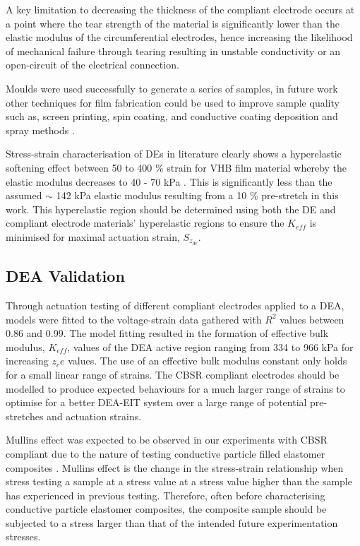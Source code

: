 A key limitation to decreasing the thickness of the compliant electrode occurs at a point where the tear strength of the material is significantly lower than the elastic modulus of the circumferential electrodes, hence increasing the likelihood of mechanical failure through tearing resulting in unstable conductivity or an open-circuit of the electrical connection.

Moulds were used successfully to generate a series of samples, in future work other techniques for film fabrication could be used to improve sample quality such as, screen printing, spin coating, and conductive coating deposition and spray methods \cite{Carpi2015, Weiss2016, Mavukkandy2020} .

Stress-strain characterisation of DEs in literature clearly shows a hyperelastic softening effect between 50 to 400 \% strain for VHB film material whereby the elastic modulus decreases to 40 - 70 kPa \cite{Liu2018} . This is significantly less than the assumed $\sim$ 142 kPa elastic modulus resulting from a 10 \% pre-stretch in this work. This hyperelastic region should be determined using both the DE and compliant electrode materials' hyperelastic regions to ensure the $K_{e\!f\!f}$ is minimised for maximal actuation strain, $S_{z_{de}}$. 


\subsection{DEA Validation}
\label{subsec:dea_validation3}
Through actuation testing of different compliant electrodes applied to a DEA, models were fitted to the voltage-strain data gathered with $R^2$ values between 0.86 and 0.99. The model fitting resulted in the formation of effective bulk modulus, $K_{e\!f\!f}$, values of the DEA active region ranging from 334 to 966 kPa for increasing $z_ce$ values. The use of an effective bulk modulus constant only holds for a small linear range of strains. The CBSR compliant electrodes should be modelled to produce expected behaviours for a much larger range of strains to optimise for a better DEA-EIT system over a large range of potential pre-stretches and actuation strains.

Mullins effect was expected to be observed in our experiments with CBSR compliant due to the nature of testing conductive particle filled elastomer composites \cite{Diani2009}. Mullins effect is the change in the stress-strain relationship when stress testing a sample at a stress value at a stress value higher than the sample has experienced in previous testing. Therefore, often before characterising conductive particle elastomer composites, the composite sample should be subjected to a stress larger than that of the intended future experimentation stresses. 

